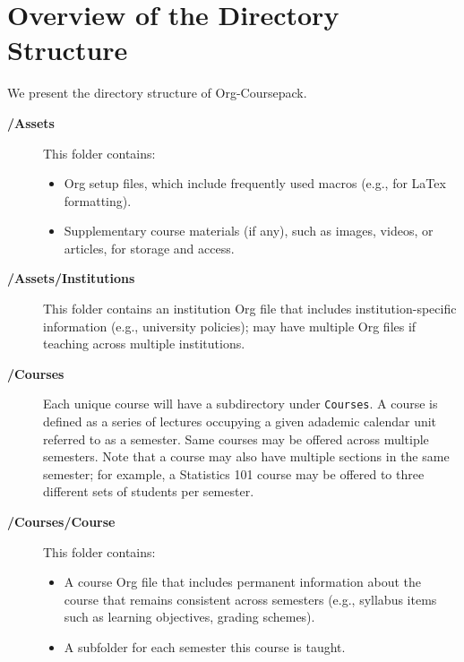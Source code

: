 \documentclass[10pt,article]{article}
\begin{document}
\section{Overview of the Directory Structure}
\label{sec:org89a567a}
We present the directory structure of Org-Coursepack.

\begin{description}
\item[{\textbf{/Assets}}] This folder contains:
\begin{itemize}
\item Org setup files, which include frequently used macros (e.g., for LaTex
formatting).
\item Supplementary course materials (if any), such as images, videos, or
articles, for storage and access.
\end{itemize}
\item[{\textbf{/Assets/Institutions}}] This folder contains an institution Org file that
includes institution-specific information (e.g., university policies);
may have multiple Org files if teaching across multiple institutions.

\item[{\textbf{/Courses}}] Each unique course will have a subdirectory under \texttt{Courses}. A
course is defined as a series of lectures occupying a given
adademic calendar unit referred to as a semester. Same courses
may be offered across multiple semesters. Note that a course
may also have multiple sections in the same semester; for
example, a Statistics 101 course may be offered to three
different sets of students per semester.
\item[{\textbf{/Courses/Course}}] This folder contains:

\begin{itemize}
\item A course Org file that includes permanent information about the course
that remains consistent across semesters (e.g., syllabus items such as
learning objectives, grading schemes).
\item A subfolder for each semester this course is taught.
\end{itemize}


\end{description}
\end{document}
